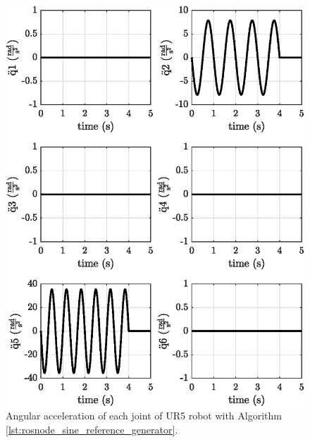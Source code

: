 \begin{figure}
    \centering
    \includegraphics{images/act_1.1/joint_acceleration.eps}
    \caption{Angular acceleration of each joint of UR5 robot with Algorithm \ref{lst:rosnode_sine_reference_generator}.}
    \label{fig:act_1.1_joint_acceleration}
\end{figure}